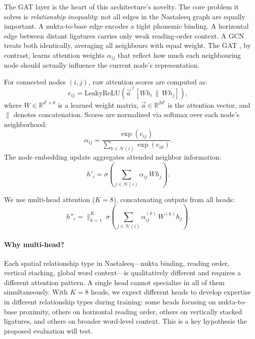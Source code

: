 \documentclass[11pt]{article}
\begin{document}
The GAT layer is the heart of this architecture's novelty.
The core problem it solves is \emph{relationship inequality}: not all edges in the
Nastaleeq graph are equally important.
A nukta-to-base edge encodes a tight phonemic binding.
A horizontal edge between distant ligatures carries only weak reading-order context.
A GCN treats both identically, averaging all neighbours with equal weight.
The GAT \citep{Velickovic2018}, by contrast, learns attention weights $\alpha_{ij}$
that reflect how much each neighbouring node should actually influence the current
node's representation.

For connected nodes $(i, j)$, raw attention scores are computed as:
\begin{equation}
  e_{ij} = \text{LeakyReLU}\!\left(\vec{a}^{\top}[Wh_i \,\|\, Wh_j]\right),
  \label{eq:attention_raw}
\end{equation}
where $W \in \mathbb{R}^{d' \times d}$ is a learned weight matrix,
$\vec{a} \in \mathbb{R}^{2d'}$ is the attention vector, and $\|$ denotes concatenation.
Scores are normalized via softmax over each node's neighborhood:
\begin{equation}
  \alpha_{ij} = \frac{\exp(e_{ij})}{\sum_{k \in \mathcal{N}(i)} \exp(e_{ik})}.
  \label{eq:attention_norm}
\end{equation}
The node embedding update aggregates attended neighbor information:
\begin{equation}
  h'_i = \sigma\!\left(\sum_{j \in \mathcal{N}(i)} \alpha_{ij}\, W h_j\right).
  \label{eq:update}
\end{equation}

We use multi-head attention ($K = 8$), concatenating outputs from all heads:
\begin{equation}
  h''_i = \Big\|_{k=1}^{K}\; \sigma\!\left(\sum_{j \in \mathcal{N}(i)} \alpha^{(k)}_{ij}\, W^{(k)} h_j\right).
  \label{eq:multihead}
\end{equation}

\paragraph{Why multi-head?}
Each spatial relationship type in Nastaleeq---nukta binding, reading order, vertical
stacking, global word context---is qualitatively different and requires a different
attention pattern.
A single head cannot specialize in all of them simultaneously.
With $K = 8$ heads, we expect different heads to develop expertise in different
relationship types during training: some heads focusing on nukta-to-base proximity,
others on horizontal reading order, others on vertically stacked ligatures, and others
on broader word-level context.
This is a key hypothesis the proposed evaluation will test.
\end{document}
